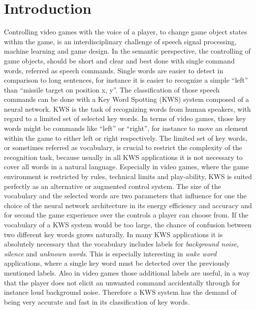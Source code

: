 
\chapter{Introduction}\label{sec:intro}
\thesisStateReady
Controlling video games with the voice of a player, to change game object states within the game, is an interdisciplinary challenge of speech signal processing, machine learning and game design.
In the semantic perspective, the controlling of game objects, should be short and clear and best done with single command words, referred as speech commands.
Single words are easier to detect in comparison to long sentences, for instance it is easier to recognize a simple \enquote{left} than \enquote{missile target on position x, y}.
The classification of those speech commands can be done with a Key Word Spotting (KWS) system composed of a neural network.
KWS is the task of recognizing words from human speakers, with regard to a limited set of selected key words.
In terms of video games, those key words might be commands like \enquote{left} or \enquote{right}, for instance to move an element within the game to either left or right respectively.
The limited set of key words, or sometimes referred as vocabulary, is crucial to restrict the complexity of the recognition task, because usually in all KWS applications it is not necessary to cover all words in a natural language.
Especially in video games, where the game environment is restricted by rules, technical limits and play-ability, KWS is suited perfectly as an alternative or augmented control system.
The size of the vocabulary and the selected words are two parameters that influence for one the choice of the neural network architecture in its energy efficiency and accuracy and for second the game experience over the controls a player can choose from.
If the vocabulary of a KWS system would be too large, the chance of confusion between two different key words grows naturally.
In many KWS applications it is absolutely necessary that the vocabulary includes labels for \emph{background noise}, \emph{silence} and \emph{unknown words}. 
This is especially interesting in \emph{wake word} applications, where a single key word must be detected over the previously mentioned labels.
Also in video games those additional labels are useful, in a way that the player does not elicit an unwanted command accidentally through for instance loud background noise.
Therefore a KWS system has the demand of being very accurate and fast in its classification of key words.

